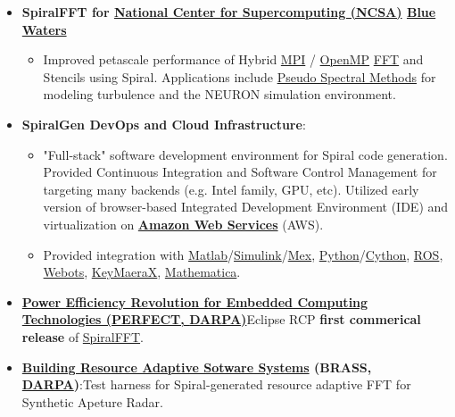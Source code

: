 \documentclass{article}
\begin{document}
\begin{itemize}
\begin{itemize}
      \item \textbf{SpiralFFT for \href{http://www.ncsa.illinois.edu}{National Center for Supercomputing  (NCSA)} \href{http://www.ncsa.illinois.edu/enabling/bluewaters}{Blue Waters}} 
      \begin{itemize}
      \item Improved petascale performance of Hybrid \href{http://en.wikipedia.org/wiki/Message_Passing_Interface}{MPI} / \href{http://en.wikipedia.org/wiki/OpenMP}{OpenMP} \href{https://en.wikipedia.org/wiki/Fast_Fourier_transform}{FFT} and Stencils using Spiral. Applications include \href{https://en.wikipedia.org/wiki/Pseudo-spectral_method}{Pseudo Spectral Methods} for modeling turbulence and the NEURON simulation environment. 
      \end{itemize}

    \item \textbf{SpiralGen DevOps and Cloud Infrastructure}: 
    \begin{itemize}
    \item "Full-stack" software development environment for Spiral code generation. Provided Continuous Integration and Software Control Management for targeting many backends (e.g. Intel family, GPU, etc). Utilized early version of browser-based Integrated Development Environment (IDE) and virtualization on \textbf{\href{https://en.wikipedia.org/wiki/Amazon_Web_Services}{Amazon Web Services}} (AWS).  
    \item Provided integration with  \href{http://www.mathworks.com/products/matlab/}{Matlab}/\href{http://www.mathworks.com/products/simulink/}{Simulink}/\href{http://www.mathworks.com/help/matlab/ref/mex.html}{Mex}, \href{https://www.python.org/}{Python}/\href{http://cython.org/}{Cython}, \href{http://www.ros.org/}{ROS}, \href{https://www.cyberbotics.com/overview}{Webots}, \href{http://www.ls.cs.cmu.edu/KeYmaeraX/}{KeyMaeraX}, \href{http://www.wolfram.com/mathematica/}{Mathematica}.
    \end{itemize}


    \item \textbf{\href{http://www.darpa.mil/Our_Work/MTO/Programs/Power_Efficiency_Revolution_for_Embedded_Computing_Technologies_(PERFECT).aspx}{Power Efficiency Revolution for Embedded Computing Technologies (PERFECT, \href{http://www.darpa.mil/default.aspx}{DARPA})}}Eclipse RCP \textbf{first commerical release} of \href{http://www.spiralgen.com/new-products/spiral-fft-gpl-10}{SpiralFFT}.  

    \item \textbf{\href{http://www.darpa.mil/program/building-resource-adaptive-software-systems}{Building Resource Adaptive Sotware Systems} (BRASS, \href{http://www.darpa.mil/default.aspx}{DARPA})}:Test harness for Spiral-generated resource adaptive FFT for Synthetic Apeture Radar. 


\end{itemize}
\end{itemize}
\end{document}
